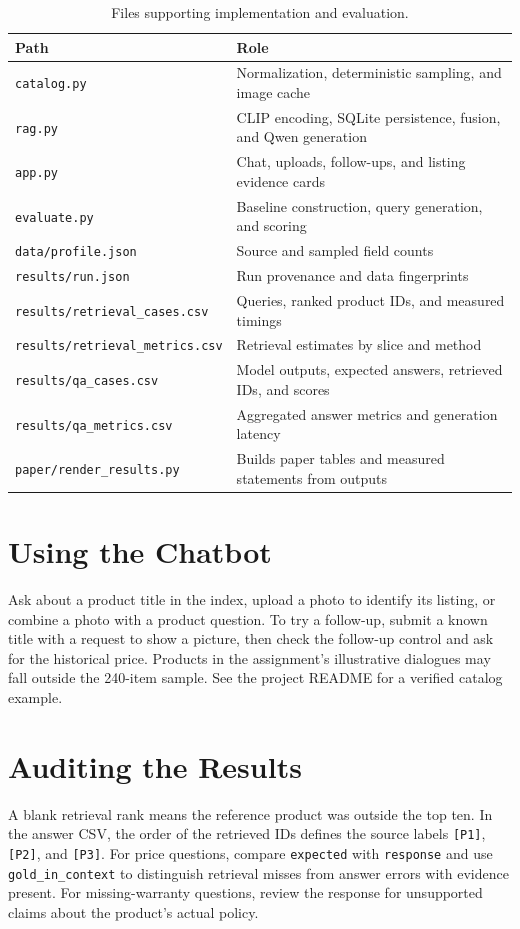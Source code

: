 \documentclass{article}
\begin{document}
\begin{table}[h]
\centering
\caption{Files supporting implementation and evaluation.}
\begin{tabular}{ll}
\toprule
Path & Role \\
\midrule
\texttt{catalog.py} & Normalization, deterministic sampling, and image cache \\
\texttt{rag.py} & CLIP encoding, SQLite persistence, fusion, and Qwen generation \\
\texttt{app.py} & Chat, uploads, follow-ups, and listing evidence cards \\
\texttt{evaluate.py} & Baseline construction, query generation, and scoring \\
\texttt{data/profile.json} & Source and sampled field counts \\
\texttt{results/run.json} & Run provenance and data fingerprints \\
\texttt{results/retrieval\_cases.csv} & Queries, ranked product IDs, and measured timings \\
\texttt{results/retrieval\_metrics.csv} & Retrieval estimates by slice and method \\
\texttt{results/qa\_cases.csv} & Model outputs, expected answers, retrieved IDs, and scores \\
\texttt{results/qa\_metrics.csv} & Aggregated answer metrics and generation latency \\
\texttt{paper/render\_results.py} & Builds paper tables and measured statements from outputs \\
\bottomrule
\end{tabular}
\end{table}

\section{Using the Chatbot}
Ask about a product title in the index, upload a photo to identify its listing, or combine a photo with a product question. To try a follow-up, submit a known title with a request to show a picture, then check the follow-up control and ask for the historical price. Products in the assignment's illustrative dialogues may fall outside the 240-item sample. See the project README for a verified catalog example.

\section{Auditing the Results}
A blank retrieval rank means the reference product was outside the top ten. In the answer CSV, the order of the retrieved IDs defines the source labels \texttt{[P1]}, \texttt{[P2]}, and \texttt{[P3]}. For price questions, compare \texttt{expected} with \texttt{response} and use \texttt{gold\_in\_context} to distinguish retrieval misses from answer errors with evidence present. For missing-warranty questions, review the response for unsupported claims about the product's actual policy.
\end{document}
